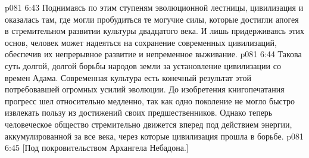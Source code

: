 \vs p081 6:43 Поднимаясь по этим ступеням эволюционной лестницы, цивилизация и оказалась там, где могли пробудиться те могучие силы, которые достигли апогея в стремительном развитии культуры двадцатого века. И лишь придерживаясь этих основ, человек может надеяться на сохранение современных цивилизаций, обеспечив их непрерывное развитие и непременное выживание.
\vs p081 6:44 \pc Такова суть долгой, долгой борьбы народов земли за установление цивилизации со времен Адама. Современная культура есть конечный результат этой потребовавшей огромных усилий эволюции. До изобретения книгопечатания прогресс шел относительно медленно, так как одно поколение не могло быстро извлекать пользу из достижений своих предшественников. Однако теперь человеческое общество стремительно движется вперед под действием энергии, аккумулированной за все века, через которые цивилизация прошла в борьбе.
\vsetoff
\vs p081 6:45 [Под покровительством Архангела Небадона.]
